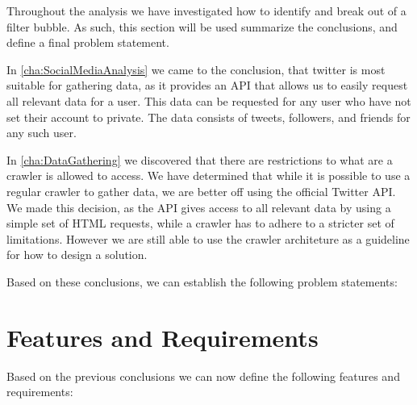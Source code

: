 
Throughout the analysis we have investigated how to identify and break out of a
filter bubble. As such, this section will be used summarize the
conclusions, and define a final problem statement.\nl

In \autoref{cha:SocialMediaAnalysis} we came to the conclusion, that twitter
is most suitable for gathering data, as it provides an API that allows us to easily
request all relevant data for a user. This data can be requested for any user
who have not set their account to private. The data consists of tweets,
followers, and friends for any such user.\nl

In \autoref{cha:DataGathering} we discovered that there are restrictions to what
are a crawler is allowed to access. We have determined that while it is
possible to use a regular crawler to gather data, we are better off using the
official Twitter API. We made this decision, as the API gives access to all
relevant data by using a simple set of HTML requests, while a crawler has to
adhere to a stricter set of limitations. However we are still able to use the
crawler architeture as a guideline for how to design a solution.\nl





Based on these conclusions, we can establish the following problem statements:

\begin{center}
\begin{minipage}{0.95\linewidth} 


\end{minipage}
\end{center}

\section{Features and Requirements}
Based on the previous conclusions we can now define the following features and
requirements:



